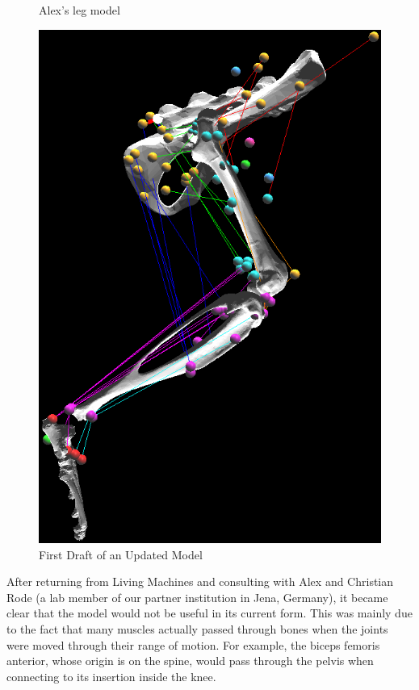 \documentclass[runningheads,a4paper]{llncs}
\begin{document}
\begin{figure}
\begin{minipage}{0.5\textwidth}
					\caption{Alex's leg model}
				\end{minipage}\hfill
				\begin{minipage}{0.5\textwidth}
					\centering
					\includegraphics[width=\textwidth]{att1.PNG}
					\caption{First Draft of an Updated Model}
				\end{minipage}
			\end{figure}
	After returning from Living Machines and consulting with Alex and Christian Rode (a lab member of our partner institution in Jena, Germany), it became clear that the model would not be useful in its current form. This was mainly due to the fact that many muscles actually passed through bones when the joints were moved through their range of motion. For example, the biceps femoris anterior, whose origin is on the spine, would pass through the pelvis when connecting to its insertion inside the knee. \par
\end{document}
